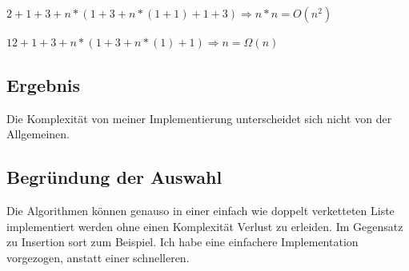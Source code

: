 \documentclass{article}
\begin{document}
$2+1+3+n*(1+3+n*(1+1)+1+3) \Rightarrow  n*n = O(n^2)$

$12+1+3+n*(1+3+n*(1)+1)    \Rightarrow  n   = \Omega(n)$

\subsection{Ergebnis}

Die Komplexität von meiner Implementierung unterscheidet sich nicht von der Allgemeinen.

\subsection{Begründung der Auswahl}
Die Algorithmen können genauso in einer einfach wie doppelt verketteten Liste implementiert werden ohne einen Komplexität Verlust zu erleiden. Im Gegensatz zu Insertion sort zum Beispiel.
Ich habe eine einfachere Implementation vorgezogen, anstatt einer schnelleren.
\end{document}
